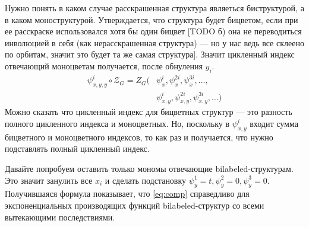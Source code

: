 Нужно понять в каком случае расскрашенная структура являеться биструктурой, а в
каком моноструктурой. Утверждается, что структура будет бицветом, если при ее
расскраске использовался хотя бы один бицвет [TODO б) она не переводиться
инволюцией в себя (как нерасскрашенная структура) --- но у нас ведь все
склеено по орбитам, значит это будет та же самая структура]. Значит цикленный
индекс отвечающий моноцветам получается, после обнуления $y_i$.
\begin{equation*}
\begin{split}
\psi_{x, y, y}^i \circ \mathcal Z_G = 
Z_G(&\psi_x^i, \psi_x^{2i}, \psi_x^{3i}, \dots,\\
	&\psi_{x,y}^i, \psi_{x,y}^{2i}, \psi_{x,y}^{3i}, \dots)
\end{split}
\end{equation*}
Можно сказать что цикленный индекс для бицветных структур --- это разность
полного цикленного индекса и моноцветных. Но, поскольку в $\psi_{x,y}^i$ входит
сумма бицветного и моноцветного индексов, то как раз и получается, что нужно
подставлять полный цикленный индекс.

Давайте попробуем оставить только мономы отвечающие bilabeled-структурам. Это
значит занулить все $x_i$ и сделать подстановку $\psi_y^1 = t, \psi_y^2 = 0,
\psi_y^3 = 0$. Получившаяся формула показывает, что \ref{eq:comp} справедливо
для экспоненциальных производящих функций bilabeled-структур со всеми
вытекающими последствиями.
